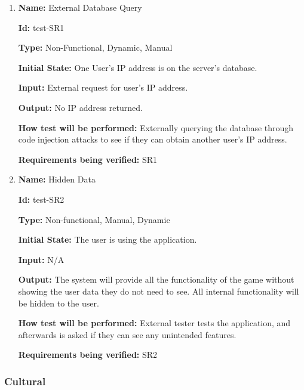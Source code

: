 \documentclass[12pt, titlepage]{article}
\begin{document}
\begin{enumerate}

\item{\textbf{Name:} External Database Query}

\textbf{Id:} test-SR1

\textbf{Type:} Non-Functional, Dynamic, Manual
					
\textbf{Initial State:} One User's IP address is on the server's database.
					
\textbf{Input:} External request for user's IP address.
					
\textbf{Output:} No IP address returned.
					
\textbf{How test will be performed:} Externally querying the database through code injection attacks to see if they can obtain another user's IP address.

\textbf{Requirements being verified:} SR1
					
\item{\textbf{Name:} Hidden Data}

\textbf{Id:} test-SR2

\textbf{Type:} Non-functional, Manual, Dynamic
					
\textbf{Initial State:} The user is using the application.
					
\textbf{Input:} N/A
					
\textbf{Output:} The system will provide all the functionality of the game without showing the user data they do not need to see. All internal functionality will be hidden to the user.
					
\textbf{How test will be performed:} External tester tests the application, and afterwards is asked if they can see any unintended features.

\textbf{Requirements being verified:} SR2

\end{enumerate}

\subsubsection{Cultural}
\end{document}
